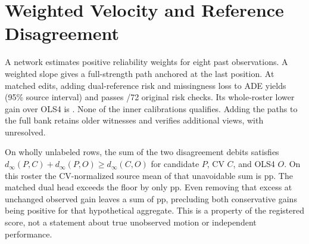 \section{Weighted Velocity and Reference Disagreement}
A network estimates positive reliability weights for eight past
observations. A weighted slope gives a full-strength path anchored
at the last position. At \WeightedVelocityEdits{} matched edits,
adding dual-reference risk and missingness loss to ADE yields
\WeightedVelocityDual{} (95\% source interval) and passes
\WeightedVelocityRiskPass/72 original risk checks. Its whole-roster
lower gain over OLS4 is \WeightedVelocityWhole{}. None of the
inner calibrations qualifies. Adding the paths to the full bank
retains \WeightedVelocityOld{} older witnesses and verifies
\WeightedVelocityNew{} additional views, with
\WeightedVelocityUnknown{} unresolved.

On wholly unlabeled rows, the sum of the two disagreement debits
satisfies $d_\infty(P,C)+d_\infty(P,O)\geq d_\infty(C,O)$
for candidate $P$, CV $C$, and OLS4 $O$. On this roster the
CV-normalized source mean of that unavoidable sum is
\WeightedVelocityFloor{} pp. The matched dual head exceeds the
floor by only \WeightedVelocityExcess{} pp. Even removing that
excess at unchanged observed gain leaves a sum of
\WeightedVelocityOptimistic{} pp, precluding both conservative
gains being positive for that hypothetical aggregate. This is a
property of the registered score, not a statement about true
unobserved motion or independent performance.
